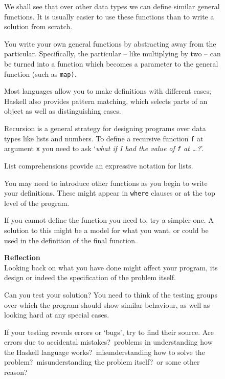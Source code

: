 \addtocounter{figure}{-1}
\begin{figure}
\itemstart
We shall see that over other data types we can
define similar general functions. It is usually easier to use
these functions than to write a solution from scratch.

\itemstart
You write your own general functions by abstracting away from the
particular. Specifically, the particular -- like multiplying by two --
can be turned into a function which becomes a parameter to the general
function (such as \texttt{map)}.

\itemstart
Most languages allow you to make definitions with different cases;
Haskell also provides pattern matching, which selects parts of an object
as well as distinguishing cases. 

\itemstart
Recursion is a general strategy for designing programs over data types
like lists and numbers. To define a recursive function \texttt{f} at
argument \texttt{x}
you need to ask `{\em what if I had the value of \mbox{\texttt{f}} at \ldots ?}'. 

\itemstart
List comprehensions provide an expressive notation for lists.

\itemstart
You may need to introduce other functions
as you begin to write your definitions. These might appear in \texttt{where}
clauses or at the top level of the program.

\itemstart
If you cannot define the function you need to, try a simpler one. A
solution to this might be a model for what you want, or could be used in the 
definition of the final function.

\bigskip
\noindent
{\sc \textbf{Reflection}}\hspace*{1mm}\hrulefill\\

\noindent
Looking back on what you have done might affect your program, its design or
indeed the specification of the problem itself.

\itemstart
Can you test your solution? You need to think of the testing groups over
which the program should show similar behaviour, as well as looking hard
at any special cases.

\itemstart
If your testing reveals errors or `bugs', try to find their source. 
Are errors due to
accidental mistakes?\ problems in understanding how the Haskell language
works?\ misunderstanding how to solve the problem?\ misunderstanding
the problem itself?\ or some other reason?


\end{figure}
